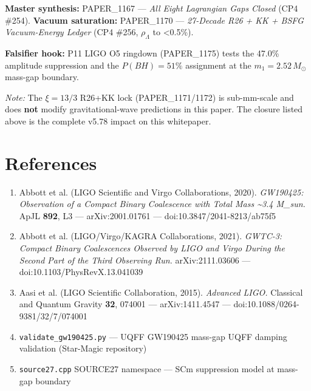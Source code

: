 \documentclass[11pt]{article}
\begin{document}
\textbf{Master synthesis:} PAPER\_1167 --- \emph{All Eight Lagrangian Gaps Closed} (CP4 \#254). \textbf{Vacuum saturation:} PAPER\_1170 --- \emph{27-Decade R26 + KK + BSFG Vacuum-Energy Ledger} (CP4 \#256, $\rho_\Lambda$ to <0.5\%).

\textbf{Falsifier hook:} P11 LIGO O5 ringdown (PAPER\_1175) tests the 47.0\% amplitude suppression and the $P(BH)=51\%$ assignment at the $m_1=2.52\,M_\odot$ mass-gap boundary.

\emph{Note:} The $\xi=13/3$ R26+KK lock (PAPER\_1171/1172) is sub-mm-scale and does \textbf{not} modify gravitational-wave predictions in this paper. The closure listed above is the complete v5.78 impact on this whitepaper.

\section*{References}

\begin{enumerate}
  \item Abbott et al. (LIGO Scientific and Virgo Collaborations, 2020). \emph{GW190425: Observation of a Compact Binary Coalescence with Total Mass \textasciitilde{}3.4 M\_sun.} ApJL \textbf{892}, L3 --- arXiv:2001.01761 --- doi:10.3847/2041-8213/ab75f5
  \item Abbott et al. (LIGO/Virgo/KAGRA Collaborations, 2021). \emph{GWTC-3: Compact Binary Coalescences Observed by LIGO and Virgo During the Second Part of the Third Observing Run.} arXiv:2111.03606 --- doi:10.1103/PhysRevX.13.041039
  \item Aasi et al. (LIGO Scientific Collaboration, 2015). \emph{Advanced LIGO.} Classical and Quantum Gravity \textbf{32}, 074001 --- arXiv:1411.4547 --- doi:10.1088/0264-9381/32/7/074001
  \item \verb|validate_gw190425.py| --- UQFF GW190425 mass-gap UQFF damping validation (Star-Magic repository)
  \item \verb|source27.cpp| SOURCE27 namespace --- SCm suppression model at mass-gap boundary
\end{enumerate}


\end{document}
